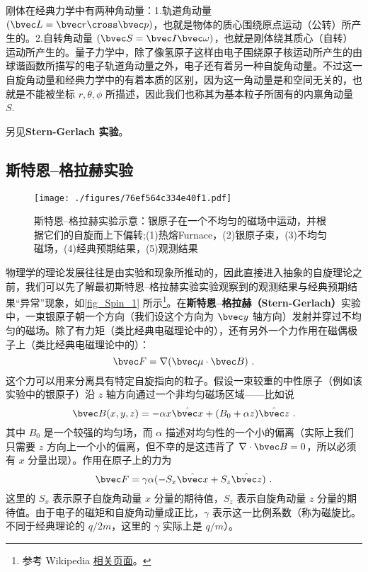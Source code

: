 
\begin{issues}
\issueDraft
\end{issues}


刚体在经典力学中有两种角动量：1.轨道角动量 $(\bvec L = \bvec r\cross\bvec p)$，也就是物体的质心围绕原点运动（公转）所产生的。2.自转角动量 $(\bvec S = \bvec I\bvec\omega)$，也就是刚体绕其质心（自转）运动所产生的。量子力学中，除了像氢原子这样由电子围绕原子核运动所产生的由球谐函数所描写的电子轨道角动量之外，电子还有着另一种自旋角动量。不过这一自旋角动量和经典力学中的有着本质的区别，因为这一角动量是和空间无关的，也就是不能被坐标 $r,\theta,\phi$ 所描述，因此我们也称其为基本粒子所固有的内禀角动量 $S$. 

另见\textbf{Stern-Gerlach 实验}。

\subsection{斯特恩–格拉赫实验}
\begin{figure}[ht]
\centering
\texttt{[image: ./figures/76ef564c334e40f1.pdf]}
\caption{斯特恩–格拉赫实验示意：银原子在一个不均匀的磁场中运动，并根据它们的自旋而上下偏转;(1)热熔Furnace，(2)银原子束，(3)不均匀磁场，(4)经典预期结果，(5)观测结果} \label{fig_Spin_1}
\end{figure}

物理学的理论发展往往是由实验和现象所推动的，因此直接进入抽象的自旋理论之前，我们可以先了解最初斯特恩–格拉赫实验实验观察到的观测结果与经典预期结果“异常”现象，如\autoref{fig_Spin_1} 所示\footnote{参考 Wikipedia \href{https://en.wikipedia.org/wiki/Stern\%E2\%80\%93Gerlach_experiment}{相关页面}。}。在\textbf{斯特恩–格拉赫（Stern-Gerlach）}实验中，一束银原子朝一个方向（我们设这个方向为 $\bvec y$ 轴方向）发射并穿过不均匀的磁场。除了有力矩（类比经典电磁理论中的），还有另外一个力作用在磁偶极子上（类比经典电磁理论中的）：
\begin{equation}\label{eq_Spin_1}
\bvec F=\nabla(\bvec \mu\cdot \bvec B)~.
\end{equation}
这个力可以用来分离具有特定自旋指向的粒子。假设一束较重的中性原子（例如该实验中的银原子）沿 $z$ 轴方向通过一个非均匀磁场区域——比如说
\begin{equation}\label{eq_Spin_2}
\bvec B(x,y,z)=-\alpha x \hat{\bvec x}+(B_0+\alpha z)\hat {\bvec z}~.
\end{equation}
其中 $B_0$ 是一个较强的均匀场，而 $\alpha$ 描述对均匀性的一个小的偏离（实际上我们只需要 $z$ 方向上一个小的偏离，但不幸的是这违背了 $\nabla\cdot \bvec B=0$，所以必须有 $x$ 分量出现）。作用在原子上的力为
\begin{equation}
\bvec F=\gamma \alpha (-S_x \hat{\bvec x}+S_z\hat{\bvec z})~.
\end{equation}
这里的 $S_x$ 表示原子自旋角动量 $x$ 分量的期待值，$S_z$ 表示自旋角动量 $z$ 分量的期待值。由于电子的磁矩和自旋角动量成正比，$\gamma$ 表示这一比例系数（称为磁旋比。不同于经典理论的 $q/2m$，这里的 $\gamma$ 实际上是 $q/m$）。

